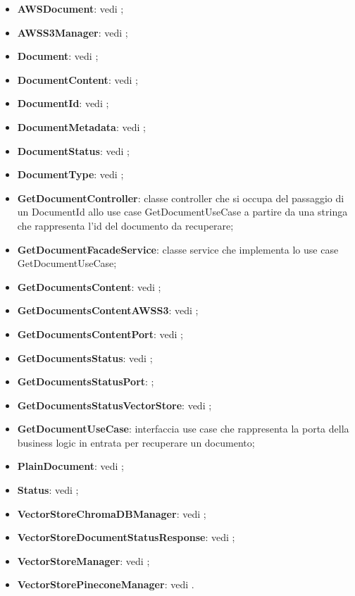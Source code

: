 \documentclass[10pt, a4paper]{article}
\begin{document}
\begin{itemize}
    \item \textbf{AWSDocument}: vedi ;
    \item \textbf{AWSS3Manager}: vedi ;
    \item \textbf{Document}: vedi ;
    \item \textbf{DocumentContent}: vedi ;
    \item \textbf{DocumentId}: vedi ;
    \item \textbf{DocumentMetadata}: vedi ;
    \item \textbf{DocumentStatus}: vedi ;
    \item \textbf{DocumentType}: vedi ;
    \item \label{GetDocumentController}\textbf{GetDocumentController}: classe controller che si occupa del passaggio di un DocumentId allo use case GetDocumentUseCase a partire da una stringa che rappresenta l'id del documento da recuperare;
    \item \label{GetDocumentFacadeService}\textbf{GetDocumentFacadeService}: classe service che implementa lo use case GetDocumentUseCase;
    \item \textbf{GetDocumentsContent}: vedi ;
    \item \textbf{GetDocumentsContentAWSS3}: vedi ;
    \item \textbf{GetDocumentsContentPort}: vedi ;
    \item \textbf{GetDocumentsStatus}: vedi ;
    \item \textbf{GetDocumentsStatusPort}: ;
    \item \textbf{GetDocumentsStatusVectorStore}: vedi ;
    \item \label{GetDocumentUseCase}\textbf{GetDocumentUseCase}: interfaccia use case che rappresenta la porta della business logic in entrata per recuperare un documento;
    \item \textbf{PlainDocument}: vedi ;    
    \item \textbf{Status}: vedi ;
    \item \textbf{VectorStoreChromaDBManager}: vedi ;
    \item \textbf{VectorStoreDocumentStatusResponse}: vedi ;
    \item \textbf{VectorStoreManager}: vedi ;
    \item \textbf{VectorStorePineconeManager}: vedi .
\end{itemize}
\end{document}
